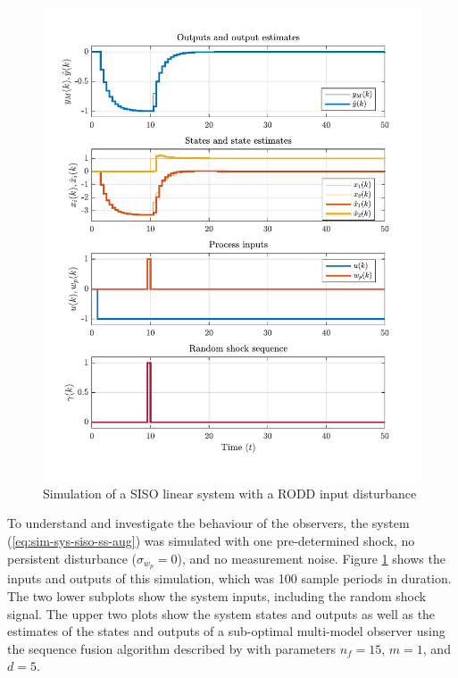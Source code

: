 \begin{figure}[htp]
	\centering
	\includegraphics[width=13cm]{images/rod_MKF_SF_test_sim_MKF_SF95_ioplot.pdf}
	\caption{Simulation of a SISO linear system with a \gls{RODD} input disturbance}
	\label{fig:rod-obs-sim-test-ioplot-SF95}
\end{figure}
To understand and investigate the behaviour of the observers, the system (\ref{eq:sim-sys-siso-ss-aug}) was simulated with one pre-determined shock, no persistent disturbance ($\sigma_{w_p}=0$), and no measurement noise. Figure \ref{fig:rod-obs-sim-test-ioplot-SF95} shows the inputs and outputs of this simulation, which was 100 sample periods in duration. The two lower subplots show the system inputs, including the random shock signal. The upper two plots show the system states and outputs as well as the estimates of the states and outputs of a sub-optimal multi-model observer using the sequence fusion algorithm described by \cite{robertson_detection_1995} with parameters $n_f=15$, $m=1$, and $d=5$.

